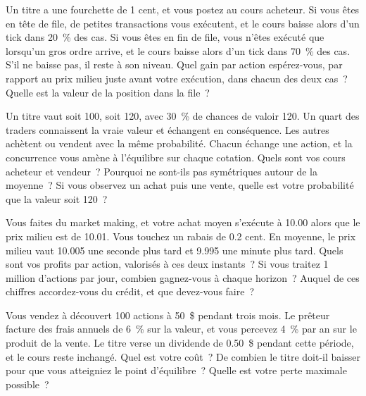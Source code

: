 \begin{question}\label{iq:iv2:markets-and-microstructure:18}
Un titre a une fourchette de 1 cent, et vous postez au cours acheteur. Si vous êtes en tête de file, de petites transactions vous exécutent, et le cours baisse alors d'un tick dans 20~\% des cas. Si vous êtes en fin de file, vous n'êtes exécuté que lorsqu'un gros ordre arrive, et le cours baisse alors d'un tick dans 70~\% des cas. S'il ne baisse pas, il reste à son niveau. Quel gain par action espérez-vous, par rapport au prix milieu juste avant votre exécution, dans chacun des deux cas~? Quelle est la valeur de la position dans la file~?
\end{question}

\begin{question}\label{iq:iv2:markets-and-microstructure:19}
Un titre vaut soit 100, soit 120, avec 30~\% de chances de valoir 120. Un quart des traders connaissent la vraie valeur et échangent en conséquence. Les autres achètent ou vendent avec la même probabilité. Chacun échange une action, et la concurrence vous amène à l'équilibre sur chaque cotation. Quels sont vos cours acheteur et vendeur~? Pourquoi ne sont-ils pas symétriques autour de la moyenne~? Si vous observez un achat puis une vente, quelle est votre probabilité que la valeur soit 120~?
\end{question}

\begin{question}\label{iq:iv2:markets-and-microstructure:20}
Vous faites du market making, et votre achat moyen s'exécute à 10.00 alors que le prix milieu est de 10.01. Vous touchez un rabais de 0.2 cent. En moyenne, le prix milieu vaut 10.005 une seconde plus tard et 9.995 une minute plus tard. Quels sont vos profits par action, valorisés à ces deux instants~? Si vous traitez 1 million d'actions par jour, combien gagnez-vous à chaque horizon~? Auquel de ces chiffres accordez-vous du crédit, et que devez-vous faire~?
\end{question}

\begin{question}\label{iq:iv2:markets-and-microstructure:21}
Vous vendez à découvert 100 actions à 50~\$ pendant trois mois. Le prêteur facture des frais annuels de 6~\% sur la valeur, et vous percevez 4~\% par an sur le produit de la vente. Le titre verse un dividende de 0.50~\$ pendant cette période, et le cours reste inchangé. Quel est votre coût~? De combien le titre doit-il baisser pour que vous atteigniez le point d'équilibre~? Quelle est votre perte maximale possible~?
\end{question}


